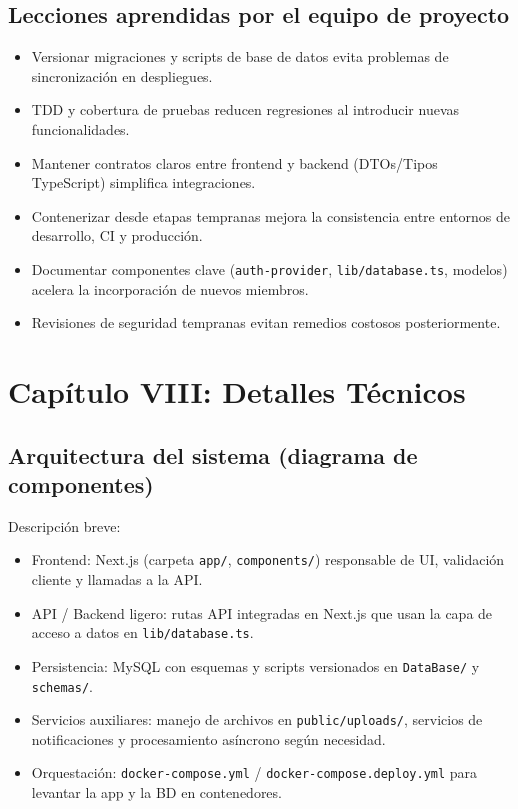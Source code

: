 \documentclass[12pt]{report}
\begin{document}
\section{Lecciones aprendidas por el equipo de proyecto}
\begin{itemize}
  \item Versionar migraciones y scripts de base de datos evita problemas de sincronización en despliegues.
  \item TDD y cobertura de pruebas reducen regresiones al introducir nuevas funcionalidades.
  \item Mantener contratos claros entre frontend y backend (DTOs/Tipos TypeScript) simplifica integraciones.
  \item Contenerizar desde etapas tempranas mejora la consistencia entre entornos de desarrollo, CI y producción.
  \item Documentar componentes clave (\texttt{auth-provider}, \texttt{lib/database.ts}, modelos) acelera la incorporación de nuevos miembros.
  \item Revisiones de seguridad tempranas evitan remedios costosos posteriormente.
\end{itemize}

\cleardoublepage
\chapter{Capítulo VIII: Detalles Técnicos}
\section{Arquitectura del sistema (diagrama de componentes)}
Descripción breve:
\begin{itemize}
  \item Frontend: Next.js (carpeta \texttt{app/}, \texttt{components/}) responsable de UI, validación cliente y llamadas a la API.
  \item API / Backend ligero: rutas API integradas en Next.js que usan la capa de acceso a datos en \texttt{lib/database.ts}.
  \item Persistencia: MySQL con esquemas y scripts versionados en \texttt{DataBase/} y \texttt{schemas/}.
  \item Servicios auxiliares: manejo de archivos en \texttt{public/uploads/}, servicios de notificaciones y procesamiento asíncrono según necesidad.
  \item Orquestación: \texttt{docker-compose.yml} / \texttt{docker-compose.deploy.yml} para levantar la app y la BD en contenedores.
\end{itemize}
\end{document}
